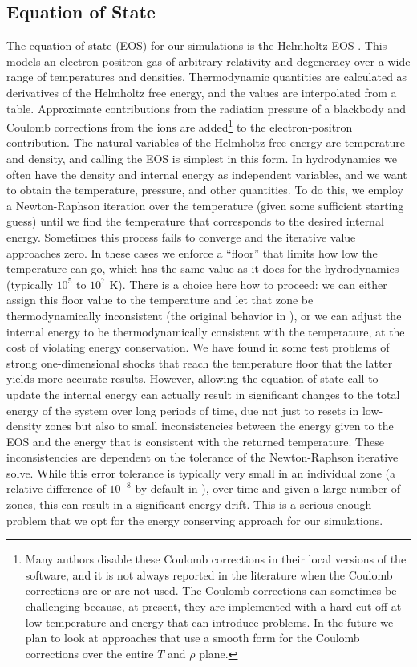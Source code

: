 \documentclass[12pt]{article}
\begin{document}
\subsection{Equation of State}
\label{sec:eos}

The equation of state (EOS) for our simulations is the Helmholtz EOS
\citep{timmes-swesty:2000}. This models an electron-positron gas of
arbitrary relativity and degeneracy over a wide range of temperatures
and densities. Thermodynamic quantities are calculated as derivatives
of the Helmholtz free energy, and the values are interpolated from a
table. Approximate contributions from the radiation pressure
of a blackbody and Coulomb corrections from the ions are
added\footnote{Many authors disable these Coulomb corrections in
their local versions of the software, and it is not always reported
in the literature when the Coulomb corrections are or are not used. The
Coulomb corrections can sometimes be challenging because, at present, they
are implemented with a hard cut-off at low temperature and energy that
can introduce problems. In the future we plan to look at approaches that
use a smooth form for the Coulomb corrections over the entire $T$ and $\rho$
plane.} to the electron-positron contribution.
The natural variables of the Helmholtz free energy are
temperature and density, and calling the EOS is simplest in this
form. In hydrodynamics we often have the density and
internal energy as independent variables, and we want to obtain the
temperature, pressure, and other quantities. To do this, we employ a
Newton-Raphson iteration over the temperature (given some sufficient
starting guess) until we find the temperature that corresponds to the
desired internal energy. Sometimes this process fails to converge and
the iterative value approaches zero. In these cases we enforce a
``floor'' that limits how low the temperature can go, which has the same
value as it does for the hydrodynamics (typically $10^5$ to $10^7$ K).
There is a choice here how to proceed: we can either
assign this floor value to the temperature and let that zone be
thermodynamically inconsistent (the original behavior in \castro), or
we can adjust the internal energy to be thermodynamically consistent
with the temperature, at the cost of violating energy conservation. We
have found in some test problems of strong one-dimensional shocks \citep{zingalekatz:2015}
that reach the temperature floor that the latter yields more accurate results. 
However, allowing the equation of state call to update the 
internal energy can actually result in significant changes to the 
total energy of the system over long periods of time, 
due not just to resets in low-density zones but also to small 
inconsistencies between the energy given to the EOS and the energy 
that is consistent with the returned temperature. These inconsistencies
are dependent on the tolerance of the Newton-Raphson iterative solve.
While this error tolerance is typically very small in an individual zone (a relative 
difference of $10^{-8}$ by default in \castro), over time and given 
a large number of zones, this can result in a significant energy 
drift. This is a serious enough problem that we opt for the energy 
conserving approach for our simulations.
\end{document}
